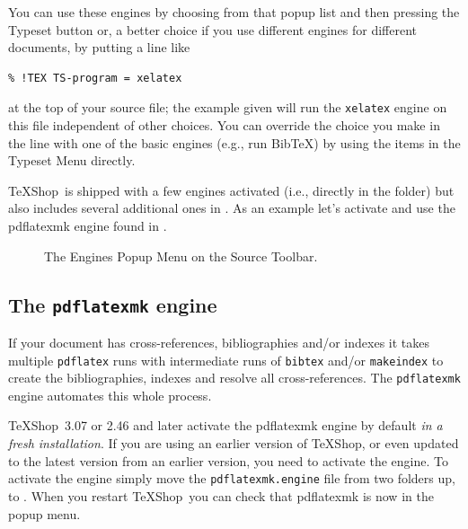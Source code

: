 \documentclass[letterpaper,11pt]{article}
\newcommand{\TS}{\textsf{\TeX Shop}}
\newcommand{\cmd}[1]{\textsf{#1}}
\newcommand{\mnu}[1]{\textsf{#1}}
\begin{document}
You can use these engines by choosing from that popup list and then pressing the Typeset button or, a better choice if you use different engines for different documents, by putting a line like
\begin{verbatim}
% !TEX TS-program = xelatex
\end{verbatim}
at the top of your source file; the example given will run the \texttt{xelatex} engine on this file independent of other choices. You can override the choice you make in the line with one of the basic engines (e.g., run \mnu{BibTeX}) by using the items in the \mnu{Typeset} Menu directly.

\TS\ is shipped with a few engines activated (i.e., directly in the  folder) but also includes several additional ones in . As an example let's activate and use the \cmd{pdflatexmk} engine found in .

\begin{figure}
\centering
{}
\caption{The Engines Popup Menu on the Source Toolbar.}
\label{fig:EnginesPopup}
\end{figure}

\subsection{The \texttt{pdflatexmk} engine}

If your document has cross-references, bibliographies and/or indexes it takes multiple \texttt{pdflatex} runs with intermediate runs of \texttt{bibtex} and/or \texttt{makeindex} to create the bibliographies, indexes and resolve all cross-references. The \texttt{pdflatexmk} engine automates this whole process.

\TS\ 3.07 or 2.46 and later activate the pdflatexmk engine by default \emph{in a fresh installation}. If you are using an earlier version of \TS, or even updated to the latest version from an earlier version, you need to activate the engine. To activate the engine simply move the \texttt{pdflatexmk.engine} file from  two folders up, to . When you restart \TS\ you can check that \cmd{pdflatexmk} is now in the popup menu.
\end{document}
